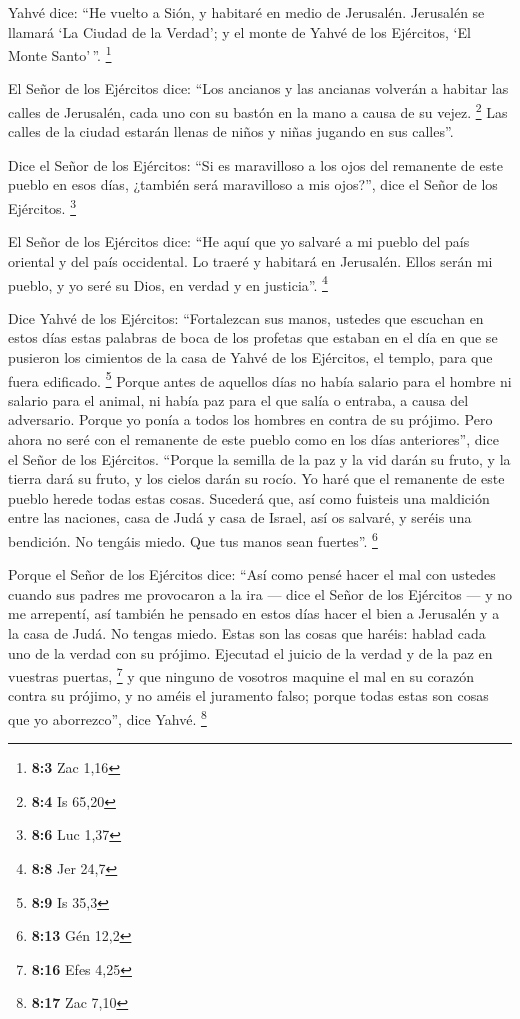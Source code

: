  Yahvé dice: ``He vuelto a Sión, y habitaré en medio de
Jerusalén. Jerusalén se llamará `La Ciudad de la Verdad'; y el monte de
Yahvé de los Ejércitos, `El Monte Santo'\,''. \footnote{\textbf{8:3} Zac
  1,16}

 El Señor de los Ejércitos dice: ``Los ancianos y las
ancianas volverán a habitar las calles de Jerusalén, cada uno con su
bastón en la mano a causa de su vejez. \footnote{\textbf{8:4} Is 65,20}
 Las calles de la ciudad estarán llenas de niños y niñas
jugando en sus calles''.

 Dice el Señor de los Ejércitos: ``Si es maravilloso a los
ojos del remanente de este pueblo en esos días, ¿también será
maravilloso a mis ojos?'', dice el Señor de los Ejércitos. \footnote{\textbf{8:6}
  Luc 1,37}

 El Señor de los Ejércitos dice: ``He aquí que yo salvaré
a mi pueblo del país oriental y del país occidental.  Lo
traeré y habitará en Jerusalén. Ellos serán mi pueblo, y yo seré su
Dios, en verdad y en justicia''. \footnote{\textbf{8:8} Jer 24,7}

 Dice Yahvé de los Ejércitos: ``Fortalezcan sus manos,
ustedes que escuchan en estos días estas palabras de boca de los
profetas que estaban en el día en que se pusieron los cimientos de la
casa de Yahvé de los Ejércitos, el templo, para que fuera edificado.
\footnote{\textbf{8:9} Is 35,3}  Porque antes de aquellos
días no había salario para el hombre ni salario para el animal, ni había
paz para el que salía o entraba, a causa del adversario. Porque yo ponía
a todos los hombres en contra de su prójimo.  Pero ahora
no seré con el remanente de este pueblo como en los días anteriores'',
dice el Señor de los Ejércitos.  ``Porque la semilla de
la paz y la vid darán su fruto, y la tierra dará su fruto, y los cielos
darán su rocío. Yo haré que el remanente de este pueblo herede todas
estas cosas.  Sucederá que, así como fuisteis una
maldición entre las naciones, casa de Judá y casa de Israel, así os
salvaré, y seréis una bendición. No tengáis miedo. Que tus manos sean
fuertes''. \footnote{\textbf{8:13} Gén 12,2}

 Porque el Señor de los Ejércitos dice: ``Así como pensé
hacer el mal con ustedes cuando sus padres me provocaron a la ira ---
dice el Señor de los Ejércitos --- y no me arrepentí, 
así también he pensado en estos días hacer el bien a Jerusalén y a la
casa de Judá. No tengas miedo.  Estas son las cosas que
haréis: hablad cada uno de la verdad con su prójimo. Ejecutad el juicio
de la verdad y de la paz en vuestras puertas, \footnote{\textbf{8:16}
  Efes 4,25}  y que ninguno de vosotros maquine el mal en
su corazón contra su prójimo, y no améis el juramento falso; porque
todas estas son cosas que yo aborrezco'', dice Yahvé. \footnote{\textbf{8:17}
  Zac 7,10}


